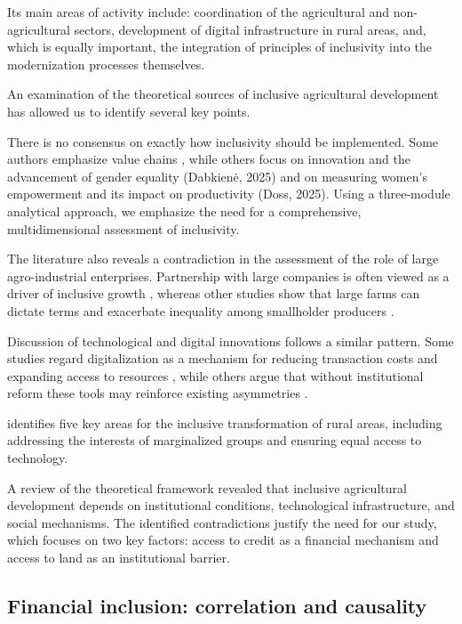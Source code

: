 ﻿\documentclass[pdflatex,sn-mathphys-ay]{sn-jnl}
\begin{document}
Its main areas of activity include: coordination of the agricultural and
non-agricultural sectors, development of digital infrastructure in rural
areas, and, which is equally important, the integration of principles of
inclusivity into the modernization processes themselves.

An examination of the theoretical sources of inclusive agricultural
development has allowed us to identify several key points.

There is no consensus on exactly how inclusivity should be implemented.
Some authors emphasize value chains \citep{ref81}, while
others focus on innovation and the advancement of gender equality
(Dabkienė, 2025) and on measuring women's empowerment and its impact on
productivity (Doss, 2025). Using a three-module analytical approach, we
emphasize the need for a comprehensive, multidimensional assessment of
inclusivity.

The literature also reveals a contradiction in the assessment of the
role of large agro-industrial enterprises. Partnership with large
companies is often viewed as a driver of inclusive growth
\citep{ref34}, whereas other studies show that large farms can dictate
terms and exacerbate inequality among smallholder producers
\citep{ref90}.

Discussion of technological and digital innovations follows a similar
pattern. Some studies regard digitalization as a mechanism for reducing
transaction costs and expanding access to resources \citep{ref105,ref72,ref43,ref37,ref104},
while others argue that without institutional reform these tools may
reinforce existing asymmetries \citep{ref28}.

\citet{ref55} identifies five key areas for the inclusive
transformation of rural areas, including addressing the interests of
marginalized groups and ensuring equal access to technology.

A review of the theoretical framework revealed that inclusive
agricultural development depends on institutional conditions,
technological infrastructure, and social mechanisms. The identified
contradictions justify the need for our study, which focuses on two key
factors: access to credit as a financial mechanism and access to land as
an institutional barrier.

\subsection{Financial inclusion: correlation and causality}
\end{document}

